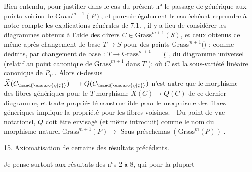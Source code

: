 
Bien entendu, pour justifier dans le cas  du présent n° le passage
de \hand{$\eta$} générique aux points voisins de $\mathrm{Grass}^{m+1}(P)$, et pouvoir également
le cas échéant reprendre à notre compte les explications générales de
7.1. , il y a lieu de considérer les diagrammes
obtenus à l'aide des divers $C \in \mathrm{Grass}^{m+1}(S)$, et  ceux obtenus de même
après changement de base $T \to S$ pour des points \hand{$\zeta$} \hand{$\in$} $\mathrm{Grass}^{m+1}($$)$ :
comme déduits, par changement de base \hand{$\zeta$} : $T \longrightarrow \mathrm{Grass}^{m+1}$ $= \underline{T}$ ,
du diagramme \uline{universel} (relatif au point canonique de $\mathrm{Grass}^{m+1}$ dans $\underline{T}$ ):
où $\underline{C}$ est la sous-variété linéaire canonique de $P_{\underline{T}}$ . Alors ci-dessus
$\widetilde{X}(C_{\hand{\unsure{\eta|\zeta}}}) \longrightarrow Q(C_{\hand{\unsure{\eta|\zeta}}})$ n'est autre que le morphisme des fibres génériques pour
le $\underline{T}$-morphisme $\widetilde{X}(\underline{C}) \longrightarrow Q(\underline{C})$ de ce dernier diagramme, et toute propri\'e-%
té constructible pour  le morphisme des fibres génériques implique
la propriété pour les fibres voisines. - Du point de vue notationel,
$Q$ doit être envisagé (et même introduit) comme le nom du morphisme 
naturel $\mathrm{Grass}^{m+1}(P) \longrightarrow$  Sous-préschémas $(\mathrm{Grass}^{m}(P))$ .

15. \uline{Axiomatisation de certains des résultats précédents}.

Je pense surtout aux résultats des n°s 2 à 8, qui pour la plupart


